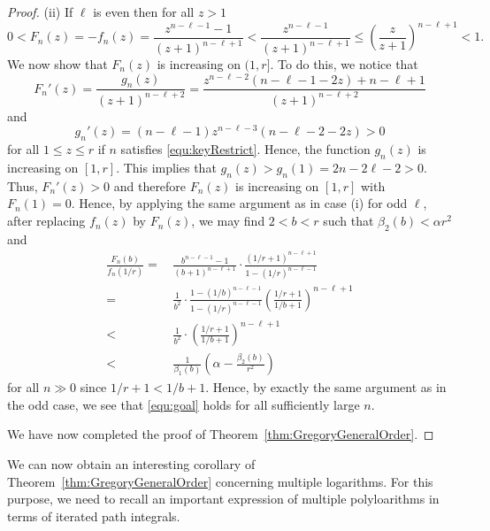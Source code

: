 \documentclass[11pt]{article}
\theoremstyle{plain}
\theoremstyle{definition}
\begin{document}
\begin{proof}
\medskip\noindent
(ii) If $\ell$ is even then  for all $z> 1$
\begin{equation*}
0<F_n(z)=-f_n(z)=\frac{z^{n-\ell-1}-1}{(z+1)^{n-\ell+1}}
<\frac{z^{n-\ell-1}}{(z+1)^{n-\ell+1}}
\le \left(\frac{z}{z+1} \right)^{n-\ell+1}<1.
\end{equation*}
We now show that $F_n(z)$ is increasing on $(1,r]$.
To do this, we notice  that
\begin{equation*}
F_n'(z)=\frac{g_n(z)}{(z+1)^{n-\ell+2}}=\frac{z^{n-\ell-2}(n-\ell-1-2z)+n-\ell+1}{(z+1)^{n-\ell+2}}
\end{equation*}
and
\begin{equation*}
g_n'(z)=(n-\ell-1)z^{n-\ell-3}(n-\ell-2-2z)>0
\end{equation*}
for all $1\le z\le r$ if $n$ satisfies \eqref{equ:keyRestrict}.
Hence, the function $g_n(z)$ is increasing on $[1,r]$. This implies that $g_n(z)>g_n(1)=2n-2\ell-2>0$.
Thus, $F_n'(z)>0$ and therefore $F_n(z)$ is increasing on $[1,r]$ with $F_n(1)=0$.
Hence, by applying the same argument as in  case (i) for odd $\ell$,
after replacing $f_n(z)$ by $F_n(z)$, we may find $2<b<r$ such that $\beta_2 (b)< \alpha r^2$
and
\begin{align*}
\frac {F_n(b)}{f_n(1/r)}=&\, \frac{b^{n-\ell-1}-1}{(b+1)^{n-\ell+1}}\cdot\frac{ (1/r+1)^{n-\ell+1}}{1-(1/r)^{n-\ell-1}}\\
=&\, \frac{1}{b^2}\cdot \frac{1-(1/b)^{n-\ell-1}}{1-(1/r)^{n-\ell-1}} \left(\frac{1/r+1}{1/b+1}\right)^{n-\ell+1}\\
< &\,  \frac{1}{b^2}\cdot \left(\frac{1/r+1}{1/b+1}\right)^{n-\ell+1}\\
<&\, \frac{1}{\beta_1 (b)}\left(\alpha-\frac{\beta_2 (b) }{r^2}\right)
\end{align*}
for all $n\gg 0$ since $1/r+1<1/b+1$. Hence, by exactly the same argument as
in the odd case, we see that \eqref{equ:goal} holds for all sufficiently large $n$.

We have now completed the proof of Theorem~\ref{thm:GregoryGeneralOrder}.
\end{proof}

We can now obtain an interesting corollary of Theorem~\ref{thm:GregoryGeneralOrder} concerning multiple logarithms.
For this purpose, we need to recall an important expression of multiple polyloarithms in terms of iterated path integrals.
\end{document}
